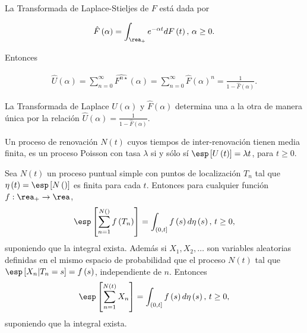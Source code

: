 \begin{Def}
La Transformada de Laplace-Stieljes de $F$ est\'a dada por

\begin{eqnarray*}
\hat{F}\left(\alpha\right)=\int_{\rea_{+}}e^{-\alpha t}dF\left(t\right)\textrm{,  }\alpha\geq0.
\end{eqnarray*}
\end{Def}

Entonces

\begin{eqnarray*}
\hat{U}\left(\alpha\right)=\sum_{n=0}^{\infty}\hat{F^{n\star}}\left(\alpha\right)=\sum_{n=0}^{\infty}\hat{F}\left(\alpha\right)^{n}=\frac{1}{1-\hat{F}\left(\alpha\right)}.
\end{eqnarray*}


\begin{Prop}
La Transformada de Laplace $\hat{U}\left(\alpha\right)$ y $\hat{F}\left(\alpha\right)$ determina una a la otra de manera \'unica por la relaci\'on $\hat{U}\left(\alpha\right)=\frac{1}{1-\hat{F}\left(\alpha\right)}$.
\end{Prop}


\begin{Note}
Un proceso de renovaci\'on $N\left(t\right)$ cuyos tiempos de inter-renovaci\'on tienen media finita, es un proceso Poisson con tasa $\lambda$ si y s\'olo s\'i $\esp\left[U\left(t\right)\right]=\lambda t$, para $t\geq0$.
\end{Note}


\begin{Teo}
Sea $N\left(t\right)$ un proceso puntual simple con puntos de localizaci\'on $T_{n}$ tal que $\eta\left(t\right)=\esp\left[N\left(\right)\right]$ es finita para cada $t$. Entonces para cualquier funci\'on $f:\rea_{+}\rightarrow\rea$,
\begin{eqnarray*}
\esp\left[\sum_{n=1}^{N\left(\right)}f\left(T_{n}\right)\right]=\int_{\left(0,t\right]}f\left(s\right)d\eta\left(s\right)\textrm{,  }t\geq0,
\end{eqnarray*}
suponiendo que la integral exista. Adem\'as si $X_{1},X_{2},\ldots$ son variables aleatorias definidas en el mismo espacio de probabilidad que el proceso $N\left(t\right)$ tal que $\esp\left[X_{n}|T_{n}=s\right]=f\left(s\right)$, independiente de $n$. Entonces
\begin{eqnarray*}
\esp\left[\sum_{n=1}^{N\left(t\right)}X_{n}\right]=\int_{\left(0,t\right]}f\left(s\right)d\eta\left(s\right)\textrm{,  }t\geq0,
\end{eqnarray*} 
suponiendo que la integral exista. 
\end{Teo}

